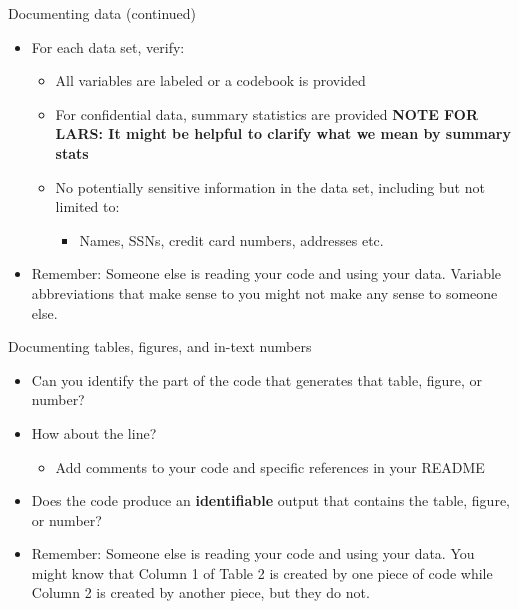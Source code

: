\documentclass[xcolor={dvipsnames}]{beamer}
\theoremstyle{definition}
\begin{document}
\begin{frame}{Documenting data (continued)}
\begin{itemize}
    \item For each data set, verify:
    \begin{itemize}
        \item All variables are labeled or a codebook is provided
        \item For confidential data, summary statistics are provided \textbf{NOTE FOR LARS: It might be helpful to clarify what we mean by summary stats}
        \item No potentially sensitive information in the data set, including but not limited to:
        \begin{itemize}
            \item Names, SSNs, credit card numbers, addresses etc.
        \end{itemize}
    \end{itemize}
    \item Remember: Someone else is reading your code and using your data. Variable abbreviations that make sense to you might not make any sense to someone else.
\end{itemize}
\end{frame}

\begin{frame}{Documenting tables, figures, and in-text numbers}
\begin{itemize}
    \item Can you identify the part of the code that generates that table, figure, or number?
    \pause
    \item How about the line?
    \pause 
    \begin{itemize}
        \item Add comments to your code and specific references in your README
    \end{itemize}
    \pause
    \item Does the code produce an \textbf{identifiable} output that contains the table, figure, or number?
    \item Remember: Someone else is reading your code and using your data. You might know that Column 1 of Table 2 is created by one piece of code while Column 2 is created by another piece, but they do not.
\end{itemize}
\end{frame}
\end{document}
